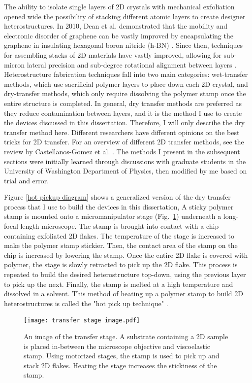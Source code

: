 \documentclass[double,12pt,1in,seploa]{beavtex}
\begin{document}
The ability to isolate single layers of 2D crystals with mechanical exfoliation opened wide the possibility of stacking different atomic layers to create designer heterostructures. In 2010, Dean et al. demonstrated that the mobility and electronic disorder of graphene can be vastly improved by encapsulating the graphene in insulating hexagonal boron nitride (h-BN) \cite{dean_boron_2010}. Since then, techniques for assembling stacks of 2D materials have vastly improved, allowing for sub-micron lateral precision and sub-degree rotational alignment between layers \cite{castellanos-gomez_van_2022}. Heterostructure fabrication techniques fall into two main categories: wet-transfer methods, which use sacrificial polymer layers to place down each 2D crystal, and dry-transfer methods, which only require dissolving the polymer stamp once the entire structure is completed. In general, dry transfer methods are preferred as they reduce contamination between layers, and it is the method I use to create the devices discussed in this dissertation. Therefore, I will only describe the dry transfer method here. Different researchers have different opinions on the best tricks for 2D transfer. For an overview of different 2D transfer methods, see the review by Castellanos-Gomez et al.  \cite{castellanos-gomez_van_2022}. The methods I present in the subsequent sections were initially learned through discussions with graduate students in the University of Washington Department of Physics, then modified by me based on trial and error.

Figure \ref{hot pickup diagram} shows a generalized version of the dry transfer process that I use to build the devices in this dissertation, A sticky polymer stamp is mounted onto a micromanipulator stage (Fig.\ \ref{transfer stage image}) underneath a long-focal length microscope. The stamp is brought into contact with a chip containing exfoliated 2D flakes. The temperature of the stage is increased to make the polymer stamp stickier. Then, the contact area of the stamp on the chip is increased by lowering the stamp. Once the entire 2D flake is covered with polymer, the stage is slowly retracted to pick up the 2D flake. This process is repeated to build the desired heterostructure top-down, using the previous layer to pick up the next. Finally, the stamp is melted at a high temperature and dissolved in a solvent. This method of heating up a polymer stamp to build 2D heterostructures is called the "hot pick up technique" \cite{pizzocchero_hot_2016}.

\begin{figure}
    \texttt{[image: transfer stage image.pdf]}
    \caption{An image of the transfer stage. A substrate containing a 2D sample is placed in-between the microscope objective and viscoelastic stamp. Using motorized stages, the stamp is used to pick up and stack 2D flakes. Heating the stage increases the stickiness of the stamp.}
    \label{transfer stage image}
\end{figure}
\end{document}
